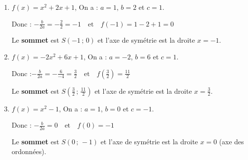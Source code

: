 \documentclass[10pt, a4paper]{article}
\begin{document}
\begin{Solution}[APPLICATION][20]
\begin{enumerate}[leftmargin=*,itemsep=0.5pt]
    \item $f(x) = x^2 + 2x + 1$, On a : \quad $a = 1$, $b = 2$ et $c = 1$.
    
     Donc : \quad $-\frac{b}{2a} = -\frac{2}{2} = -1 \quad \text{et} \quad f(-1) = 1 - 2 + 1 = 0$ 
     
    Le \textbf{sommet} est $S(-1\,;\,0)$ et l'axe de symétrie est la droite $x = -1$.

    \item $f(x) = -2x^2 + 6x + 1$, On a : \quad $a = -2$, $b = 6$ et $c = 1$.
    
     Donc :\quad $-\frac{b}{2a} = -\frac{6}{-4} = \frac{3}{2} \quad \text{et} \quad f\!\left(\frac{3}{2}\right) = \frac{11}{2}$ 
     
    Le \textbf{sommet} est $S\!\left(\frac{3}{2}\,;\,\frac{11}{2}\right)$ et l'axe de symétrie est la droite $x = \frac{3}{2}$.

    \item $f(x) = x^2 - 1$, On a : \quad $a = 1$, $b = 0$ et $c= -1$.
    
    Donc : \quad  $-\frac{b}{2a} = 0 \quad \text{et} \quad f(0) = -1$ 
    
    Le \textbf{sommet} est $S(0\,;\,-1)$ et l'axe de symétrie est la droite $x = 0$ (axe des ordonnées).
\end{enumerate}
\end{Solution}
\end{document}
